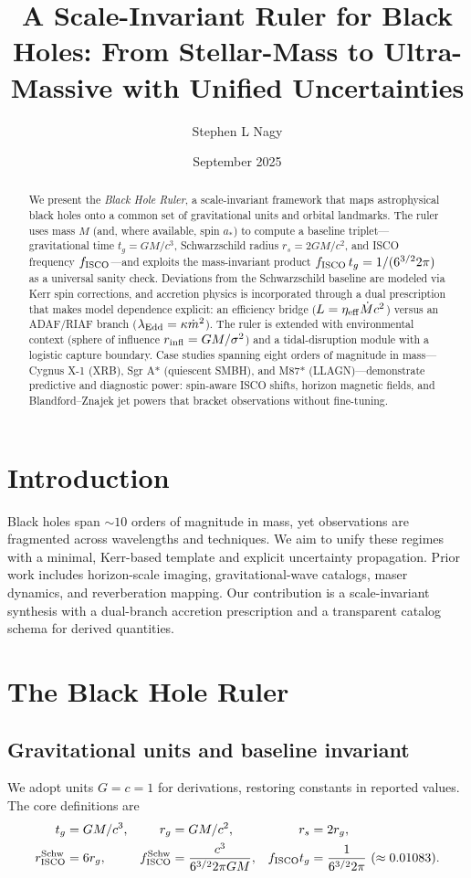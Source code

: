 \documentclass[11pt]{article}
\title{A Scale-Invariant Ruler for Black Holes: From Stellar-Mass to Ultra-Massive with Unified Uncertainties}
\author{Stephen L Nagy}
\affil{Independent Researcher}
\date{September 2025}
\begin{document}
\maketitle

\begin{abstract}
We present the \emph{Black Hole Ruler}, a scale-invariant framework that maps astrophysical black holes onto a common set of gravitational units and orbital landmarks. The ruler uses mass $M$ (and, where available, spin $a_*$) to compute a baseline triplet---gravitational time $t_g=GM/c^3$, Schwarzschild radius $r_s=2GM/c^2$, and ISCO frequency $f_{\rm ISCO}$---and exploits the mass-invariant product $f_{\rm ISCO}\,t_g = 1/(6^{3/2}2\pi)$ as a universal sanity check. Deviations from the Schwarzschild baseline are modeled via Kerr spin corrections, and accretion physics is incorporated through a dual prescription that makes model dependence explicit: an efficiency bridge ($L=\eta_{\rm eff}\dot{M}c^2$) versus an ADAF/RIAF branch ($\lambda_{\rm Edd}=\kappa\dot{m}^2$). The ruler is extended with environmental context (sphere of influence $r_{\rm infl}=GM/\sigma^2$) and a tidal-disruption module with a logistic capture boundary. Case studies spanning eight orders of magnitude in mass---Cygnus X-1 (XRB), Sgr A* (quiescent SMBH), and M87* (LLAGN)---demonstrate predictive and diagnostic power: spin-aware ISCO shifts, horizon magnetic fields, and Blandford--Znajek jet powers that bracket observations without fine-tuning.
\end{abstract}

\section{Introduction}
Black holes span $\sim 10$ orders of magnitude in mass, yet observations are fragmented across wavelengths and techniques. We aim to unify these regimes with a minimal, Kerr-based template and explicit uncertainty propagation. Prior work includes horizon-scale imaging, gravitational-wave catalogs, maser dynamics, and reverberation mapping. Our contribution is a scale-invariant synthesis with a dual-branch accretion prescription and a transparent catalog schema for derived quantities.

\section{The Black Hole Ruler}
\subsection{Gravitational units and baseline invariant}
We adopt units $G=c=1$ for derivations, restoring constants in reported values. The core definitions are
\begin{align}
 t_g &= GM/c^3, & r_g &= GM/c^2, & r_s &= 2r_g,\\
 r_{\rm ISCO}^{\rm Schw} &= 6r_g, & f_{\rm ISCO}^{\rm Schw} &= \frac{c^3}{6^{3/2}2\pi GM}, & f_{\rm ISCO}t_g &= \frac{1}{6^{3/2}2\pi}\ (\approx 0.01083).
\end{align}
\end{document}
